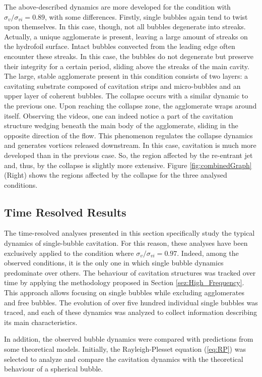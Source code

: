 The above-described dynamics are more developed for the condition with $\sigma_v/\sigma_{vi} = 0.89$, with some differences.
Firstly, single bubbles again tend to twist upon themselves. In this case, though, not all bubbles degenerate into streaks. Actually, a unique agglomerate is present, leaving a large amount of streaks on the hydrofoil surface. 
Intact bubbles convected from the leading edge often encounter these streaks. In this case, the bubbles do not degenerate but preserve their integrity for a certain period, sliding above the streaks of the main cavity.
The large, stable agglomerate present in this condition consists of two layers: a cavitating substrate composed of cavitation strips and micro-bubbles and an upper layer of coherent bubbles.
The collapse occurs with a similar dynamic to the previous one. Upon reaching the collapse zone, the agglomerate wraps around itself. Observing the videos, one can indeed notice a part of the cavitation structure wedging beneath the main body of the agglomerate, sliding in the opposite direction of the flow. This phenomenon regulates the collapse dynamics and generates vortices released downstream.
In this case, cavitation is much more developed than in the previous case. So, the region affected by the re-entrant jet and, thus, by the collapse is slightly more extensive. Figure \ref{fig:combinedGraph} (Right) shows the regions affected by the collapse for the three analysed conditions.

\subsection{Time Resolved Results}
\label{sez:timeResolvedResults}

The time-resolved analyses presented in this section specifically study the typical dynamics of single-bubble cavitation. For this reason, these analyses have been exclusively applied to the condition where  $\sigma_v/\sigma_{vi} = 0.97$. Indeed, among the observed conditions, it is the only one in which single bubble dynamics predominate over others.
The behaviour of cavitation structures was tracked over time by applying the methodology proposed in Section \ref{sez:High_Frequency}. This approach allows focusing on single bubbles while excluding agglomerates and free bubbles.
The evolution of over five hundred individual single bubbles was traced, and each of these dynamics was analyzed to collect information describing its main characteristics. 

In addition, the observed bubble dynamics were compared with predictions from some theoretical models. Initially, the Rayleigh-Plesset equation (\ref{eq:RP}) was selected to analyze and compare the cavitation dynamics with the theoretical behaviour of a spherical bubble.

